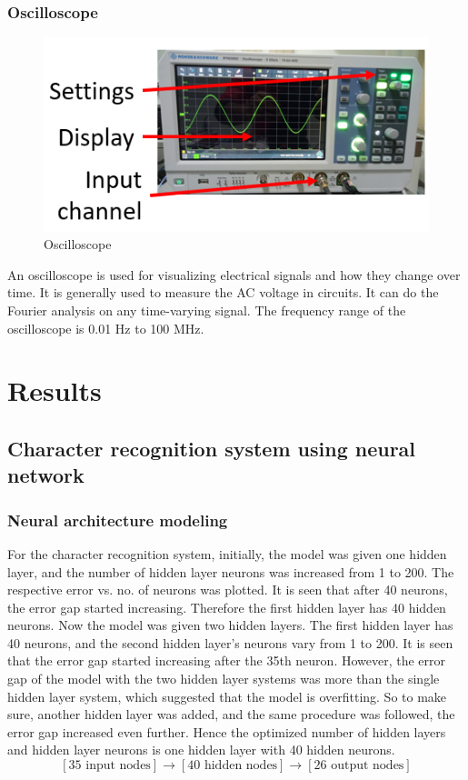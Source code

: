 \documentclass[12pt,a4paper,bold]{thesis}
\theoremstyle{thm}
\theoremstyle{definition}
\begin{document}
\subsection{Oscilloscope}
\begin{figure}[H]
	\centering
   \includegraphics[scale=0.56]{Images/17.png} 
   \caption{Oscilloscope}
\end{figure}
An oscilloscope is used for visualizing electrical signals and how they change over time. It is generally used to measure the AC voltage in circuits. It can do the Fourier analysis on any time-varying signal. The frequency range of the oscilloscope is 0.01 Hz to 100 MHz.

\chapter{Results} \label{ch: results}

\section{Character recognition system using neural network}
\subsection{Neural architecture modeling}
For the character recognition system, initially, the model was given one hidden layer, and the number of hidden layer neurons was increased from 1 to 200. The respective error vs. no. of neurons was plotted. It is seen that after 40 neurons, the error gap started increasing. Therefore the first hidden layer has 40 hidden neurons. Now the model was given two hidden layers. The first hidden layer has 40 neurons, and the second hidden layer's neurons vary from 1 to 200. It is seen that the error gap started increasing after the 35th neuron. However, the error gap of the model with the two hidden layer systems was more than the single hidden layer system, which suggested that the model is overfitting. So to make sure, another hidden layer was added, and the same procedure was followed, the error gap increased even further. Hence the optimized number of hidden layers and hidden layer neurons is one hidden layer with 40 hidden neurons.
\[[35\text{ input nodes}] \longrightarrow [40\text{ hidden nodes}] \longrightarrow [26\text{ output nodes}]\] 
\end{document}
